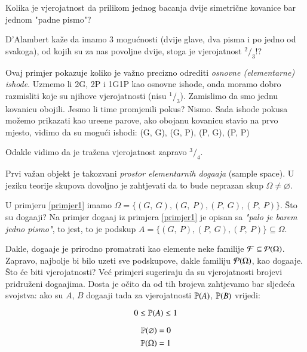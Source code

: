 \begin{pr}[D'Alambert 1754] \label{primjer1}
    Kolika je vjerojatnost da prilikom jednog bacanja dvije
    simetri\v cne kovanice bar jednom "padne pismo"?
\end{pr}

\begin{rj}
    D'Alambert ka\v ze da imamo 3 mogu\' cnosti (dvije glave,
    dva pisma i po jedno od svakoga), od kojih su za nas povoljne
    dvije, stoga je vjerojatnost $^2 / _3$!?
    
    Ovaj primjer pokazuje koliko je va\v zno precizno odrediti
    \emph{osnovne (elementarne) ishode}. Uzmemo li 2G, 2P i 1G1P kao
    osnovne ishode, onda moramo dobro razmisliti koje su njihove
    vjerojatnosti (nisu $^1 / _3$). Zamislimo da smo jednu
    kovanicu obojili. Jesmo li time promjenili pokus? Nismo.
    Sada ishode pokusa mo\v zemo prikazati kao ure\dj ene parove,
    ako obojanu kovanicu stavio na prvo mjesto, vidimo da su
    mogu\' ci ishodi:
    (G, G), (G, P), (P, G), (P, P)
    
    Odakle vidimo da je tra\v zena vjerojatnost zapravo $^3 / _4$.
\end{rj}

Prvi va\v zan objekt je takozvani \emph{prostor elementarnih
doga\dj aja} (sample space). U jeziku teorije skupova dovoljno je
zahtjevati da to bude neprazan skup $\Omega \neq \varnothing$.

U primjeru \ref{primjer1} imamo $ \Omega = \{(G, \: G), (G, \: P),
(P, \: G), (P, \: P)\}$. \v Sto su doga\dj aji? Na primjer doga\dj aj
iz primjera \ref{primjer1} je opisan sa \emph{"palo je barem
jedno pismo"}, to jest, to je podskup $A = \{(G, \: P),(P, \: G),
(P, \: P)\} \subseteq \Omega$.

Dakle, doga\dj aje je prirodno promatrati kao elemente neke familije
$\mathcal{F} \subseteq \mathcal{P}({\Omega})$. Zapravo, najbolje bi bilo uzeti
sve podskupove, dakle familiju $\mathcal{P}({\Omega})$, kao doga\dj aje.
\v Sto \' ce biti vjerojatnosti? Ve\' c primjeri sugeriraju da su
vjerojatnosti brojevi pridru\v zeni doga\dj ajima. Dosta je o\v cito
da od tih brojeva zahtjevamo bar sljede\' ca svojstva: ako su $A$,
$B$ doga\dj aji tada za vjerojatnosti $\mathbb{P}({A})$, $\mathbb{P}({B})$
vrijedi:

\begin{equation} \label{vjerPrav1}
    0 \leq \mathbb{P}({A}) \leq 1
\end{equation}

\begin{align} \label{vjerPrav2}
    \begin{split}
        \mathbb{P}({\varnothing}) &= 0 \\
        \mathbb{P}({\Omega}) &= 1
    \end{split}
\end{align}

